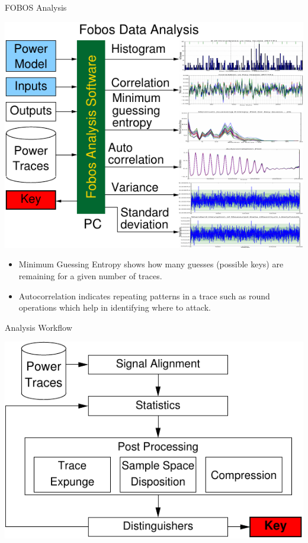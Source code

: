 \documentclass[xcolor=pdftex,dvipsnames,table,final]{beamer}
\begin{document}
\begin{frame}[fragile]{}
\begin{columns}[t]
\begin{column}{.31\linewidth}
       \begin{block}{FOBOS Analysis}
        \begin{minipage}{0.69\linewidth}
		\includegraphics[scale=1.5]{../figures/fobos-dan}
        \end{minipage}
	\hspace{-5ex}
	\begin{minipage}{0.31\linewidth}
          {\small
          \begin{itemize}
            \item Minimum Guessing Entropy shows how many guesses (possible keys) are 
                  remaining for a given number of traces. 
            \item Autocorrelation indicates repeating patterns in a trace such as round 
                  operations which help in identifying where to attack. 
          \end{itemize}
          }  
	\end{minipage} 
       \end{block}
       \begin{block}{Analysis Workflow}
        \vspace{-1ex}
        \begin{center}
          \includegraphics[scale=1.5]{../figures/data_anl}

\end{center}
\end{block}
\end{column}
\end{columns}
\end{frame}
\end{document}
